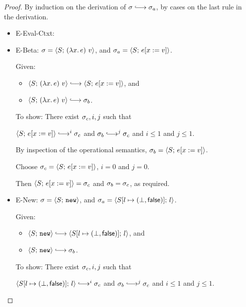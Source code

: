 \begin{proof}

  By induction on the derivation of $\conf \parstepsto \conf_a$, by
  cases on the last rule in the derivation.

  \begin{itemize}
    \item {\sc E-Eval-Ctxt}: 

    \item {\sc E-Beta}: $\sigma = \langle S;\, (\lambda x.\,e)~v \rangle$,
      and $\sigma_a = \langle S;\, e[x := v] \rangle$.

      Given:
      \begin{itemize}
      \item $\config{S}{\app{(\lam{x}{e})}{v}} \parstepsto
        \config{S}{\subst{e}{x}{v}}$, and
      \item $\config{S}{\app{(\lam{x}{e})}{v}} \parstepsto \conf_b$.
      \end{itemize}

      To show: There exist $\sigma_c, i, j$ such that

      $\config{S}{\subst{e}{x}{v}} \parstepsto^i \conf_c$ and $\conf_b
      \parstepsto^j \conf_c$ and $i \leq 1$ and $j \leq 1$.

      By inspection of the operational semantics, $\sigma_b =
      \langle S;\, e[x := v] \rangle$.

      Choose $\sigma_c = \langle S;\, e[x := v] \rangle$, $i = 0$ and $j =
      0$.

      Then $\langle S;\, e[x := v] \rangle = \sigma_c$ and $\sigma_b =
      \sigma_c$, as required.

    \item {\sc E-New}: $\sigma = \langle S;\, \mbox{\texttt{new}} \rangle$, and $\sigma_a =
      \langle S[l \mapsto (\bot, \textsf{false})];\, l \rangle$.

      Given:
      \begin{itemize}
      \item $\config{S}{\NEW} \parstepsto
        \config{\extS{S}{l}{\bot}{\frozenfalse}}{l}$, and
      \item $\config{S}{\NEW} \parstepsto \conf_b$.
      \end{itemize}

      To show: There exist $\sigma_c, i, j$ such that

      $\config{\extS{S}{l}{\bot}{\frozenfalse}}{l} \parstepsto^i
      \conf_c$ and $\conf_b \parstepsto^j \conf_c$ and $i \leq 1$ and
      $j \leq 1$.


\end{itemize}
\end{proof}
